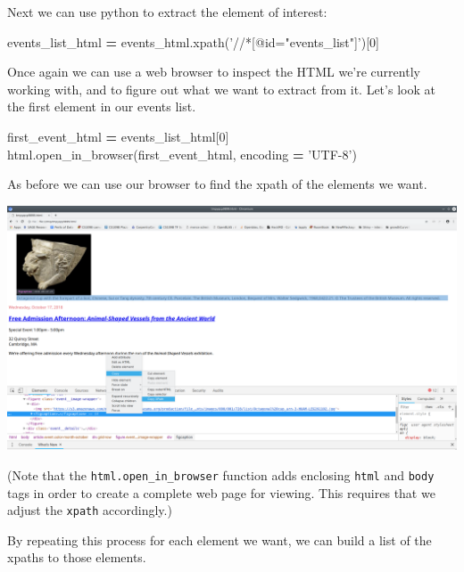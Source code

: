 \documentclass[]{book}
\newenvironment{Shaded}{\begin{snugshade}}{\end{snugshade}}
\newcommand{\DecValTok}[1]{\textcolor[rgb]{0.00,0.00,0.81}{#1}}
\newcommand{\NormalTok}[1]{#1}
\newcommand{\OperatorTok}[1]{\textcolor[rgb]{0.81,0.36,0.00}{\textbf{#1}}}
\newcommand{\StringTok}[1]{\textcolor[rgb]{0.31,0.60,0.02}{#1}}
\begin{document}
Next we can use python to extract the element of interest:

\begin{Shaded}
\begin{Highlighting}[]
\NormalTok{events_list_html }\OperatorTok{=}\NormalTok{ events_html.xpath(}\StringTok{'//*[@id="events_list"]'}\NormalTok{)[}\DecValTok{0}\NormalTok{]}
\end{Highlighting}
\end{Shaded}

Once again we can use a web browser to inspect the HTML we're
currently working with, and to figure out what we want to extract from
it. Let's look at the first element in our events list.

\begin{Shaded}
\begin{Highlighting}[]
\NormalTok{first_event_html }\OperatorTok{=}\NormalTok{ events_list_html[}\DecValTok{0}\NormalTok{]}
\NormalTok{html.open_in_browser(first_event_html, encoding }\OperatorTok{=} \StringTok{'UTF-8'}\NormalTok{)}
\end{Highlighting}
\end{Shaded}

As before we can use our browser to find the xpath of the elements we
want.

\includegraphics{Python/PythonWebScrape/images/dev_tools_figcaption.png}

(Note that the \texttt{html.open\_in\_browser} function adds enclosing \texttt{html}
and \texttt{body} tags in order to create a complete web page for viewing.
This requires that we adjust the \texttt{xpath} accordingly.)

By repeating this process for each element we want, we can build a
list of the xpaths to those elements.
\end{document}
